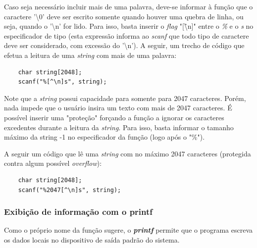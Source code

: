 \documentclass[12pt]{article}
\newcommand\tab[1][1cm]{\hspace*{#1}}
\begin{document}
\par\tab Caso seja necessário incluir mais de uma palavra, deve-se informar à função que o caractere '\textbackslash 0' deve ser escrito somente quando houver uma quebra de linha, ou seja, quando o '\textbackslash n' for lido. Para isso, basta inserir o \textit{flag} "[\^\textbackslash n]" entre o \textit{\%} e o \textit{s} no especificador de tipo (esta expressão informa ao \textit{scanf} que todo tipo de caractere deve ser considerado, com excessão do '\textbackslash n'). A seguir, um trecho de código que efetua a leitura de uma \textit{string} com mais de uma palavra:

\hspace{0.25cm}
\begin{lstlisting}
    char string[2048];
    scanf("%[^\n]s", string);
\end{lstlisting}

\hspace{0.25cm}
\begin{tcolorbox}[colback=blue!5!white,colframe=blue!75!black,title=Dica!]
  \par\tab Note que a \textit{string} possui capacidade para somente para 2047 caracteres. Porém, nada impede que o usuário insira um texto com mais de 2047 caracteres. É possível inserir uma "proteção" forçando a função a ignorar os caracteres excedentes durante a leitura da \textit{string}. Para isso, basta informar o tamanho máximo da string -1 no especificador da função (logo após o "\%").
\end{tcolorbox}

\par\tab A seguir um código que lê uma \textit{string} com no máximo 2047 caracteres (protegida contra algum possível \textit{overflow}):

\hspace{0.25cm}
\begin{lstlisting}
    char string[2048];
    scanf("%2047[^\n]s", string);
\end{lstlisting}

\subsubsection{Exibição de informação com o printf}

\par\tab Como o próprio nome da função sugere, o \textbf{\textit{printf}} permite que o programa escreva os dados locais no dispositivo de saída padrão do sistema.
\end{document}
